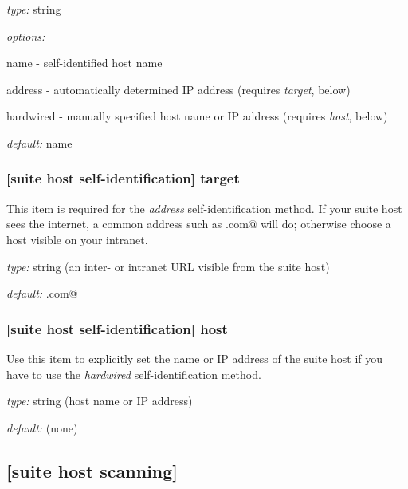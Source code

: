 \begin{myitemize}
\item {\em type:} string
\item {\em options:}
\begin{myitemize}
    \item name - self-identified host name
    \item address - automatically determined IP address (requires {\em target}, below)
    \item hardwired - manually specified host name or IP address (requires {\em host}, below)
\end{myitemize}
\item {\em default:} name
\end{myitemize}

\subsubsection[target]{[suite host self-identification] \textrightarrow target }

This item is required for the {\em address} self-identification method.
If your suite host sees the internet, a common address such as
\lstinline@google.com@ will do; otherwise choose a host visible on your
intranet.
\begin{myitemize}
\item {\em type:} string (an inter- or intranet URL visible from the suite host)
\item {\em default:} \lstinline@google.com@
\end{myitemize}


\subsubsection[host]{[suite host self-identification] \textrightarrow host }

Use this item to explicitly set the name or IP address of the suite host
if you have to use the {\em hardwired} self-identification method.
\begin{myitemize}
\item {\em type:} string (host name or IP address)
\item {\em default:} (none)
\end{myitemize}

\subsection{[suite host scanning]}

